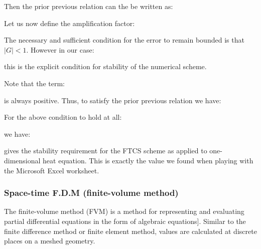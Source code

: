 	Then the prior previous relation can the be written as:
	
	Let us now define the amplification factor:
	
	The necessary and sufficient condition for the error to remain bounded is that $|G|<1$. However in our case:
	
	this is the explicit condition for stability of the numerical scheme.
	
	Note that the term:
	
	is always positive. Thus, to satisfy the prior previous relation we have:
	
	For the above condition to hold at all:
	
	we have:
	
	gives the stability requirement for the FTCS scheme as applied to one-dimensional heat equation. This is exactly the value we found when playing with the Microsoft Excel worksheet.
	
	\subsubsection{Space-time F.D.M (finite-volume method)}
	The finite-volume method (FVM) is a method for representing and evaluating partial differential equations in the form of algebraic equations]. Similar to the finite difference method or finite element method, values are calculated at discrete places on a meshed geometry. 
	
